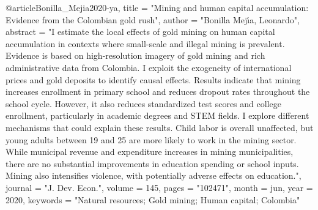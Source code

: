 {@article{Bonilla_Mejia2020-ya,
	title    = "Mining and human capital accumulation: Evidence from the
	Colombian gold rush",
	author   = "Bonilla Mej{\'\i}a, Leonardo",
	abstract = "I estimate the local effects of gold mining on human capital
	accumulation in contexts where small-scale and illegal mining is
	prevalent. Evidence is based on high-resolution imagery of gold
	mining and rich administrative data from Colombia. I exploit the
	exogeneity of international prices and gold deposits to identify
	causal effects. Results indicate that mining increases enrollment
	in primary school and reduces dropout rates throughout the school
	cycle. However, it also reduces standardized test scores and
	college enrollment, particularly in academic degrees and STEM
	fields. I explore different mechanisms that could explain these
	results. Child labor is overall unaffected, but young adults
	between 19 and 25 are more likely to work in the mining sector.
	While municipal revenue and expenditure increases in mining
	municipalities, there are no substantial improvements in
	education spending or school inputs. Mining also intensifies
	violence, with potentially adverse effects on education.",
	journal  = "J. Dev. Econ.",
	volume   =  145,
	pages    = "102471",
	month    =  jun,
	year     =  2020,
	keywords = "Natural resources; Gold mining; Human capital; Colombia"
}

}
